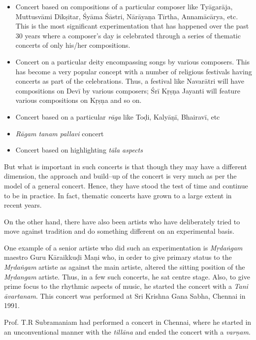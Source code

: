 \begin{itemize}
\itemsep=0pt
\item Concert based on compositions of a particular composer like Tyāgarāja, Muttusvāmi Dīkṣitar, Śyāma Śāstri, Nārāyaṇa Tīrtha, Annamācārya, etc. This is the most significant experimentation that has happened over the past 30 years where a composer’s day is celebrated through a series of thematic concerts of only his/her compositions.

 \item Concert on a particular deity encompassing songs by various composers. This has become a very popular concept with a number of religious festivals having concerts as part of the celebrations. Thus, a festival like Navarātri will have compositions on Devī by various composers; Śrī Kṛṣṇa Jayanti will feature various compositions on Kṛṣṇa and so on.

 \item Concert based on a particular \textit{rāga} like Toḍi, Kalyāṇī, Bhairavī, etc

 \item \textit{Rāgam tanam pallavi} concert

 \item Concert based on highlighting \textit{tāla aspects}

\end{itemize}

But what is important in such concerts is that though they may have a different dimension, the approach and build–up of the concert is very much as per the model of a general concert. Hence, they have stood the test of time and continue to be in practice. In fact, thematic concerts have grown to a large extent in recent years.

On the other hand, there have also been artists who have deliberately tried to move against tradition and do something different on an experimental basis.

One example of a senior artiste who did such an experimentation is \textit{Mṛdaṅgam} maestro Guru Kāraikkuḍi Maṇi who, in order to give primary status to the \textit{Mṛdaṅgam} artiste as against the main artiste, altered the sitting position of the \textit{Mṛdangam} artiste. Thus, in a few such concerts, he sat centre stage. Also, to give prime focus to the rhythmic aspects of music, he started the concert with a \textit{Tani āvartanam}. This concert was performed at Sri Krishna Gana Sabha, Chennai in 1991.

Prof. T.R Subramaniam had performed a concert in Chennai, where he started in an unconventional manner with the \textit{tillāna} and ended the concert with a \textit{varṇam}.

